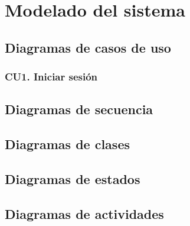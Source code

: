 \section{Modelado del sistema}

\subsection{Diagramas de casos de uso}

\subsubsection{CU1. Iniciar sesión}

\subsection{Diagramas de secuencia}

\subsection{Diagramas de clases}

\subsection{Diagramas de estados}

\subsection{Diagramas de actividades}